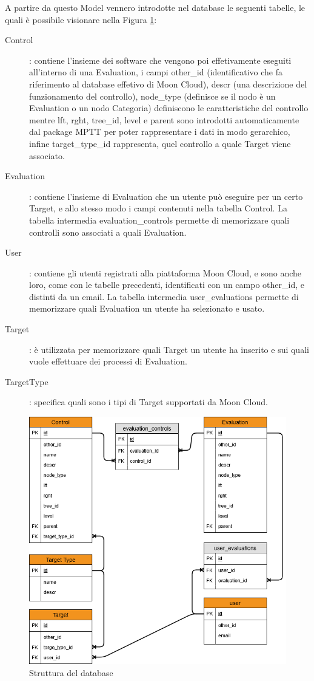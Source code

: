 A partire da questo Model vennero introdotte nel database le seguenti tabelle, le quali è possibile visionare nella Figura 
\ref{fig:str_db_project}:
\begin{description}
	\item[Control]: contiene l'insieme dei software che vengono poi effetivamente eseguiti all'interno di una Evaluation, 
	i campi other\_id (identificativo che fa riferimento al database effetivo di Moon Cloud),
	descr (una descrizione del funzionamento del controllo), node\_type (definisce se il nodo è un Evaluation o un nodo Categoria)
	definiscono le caratteristiche del controllo mentre lft, rght, tree\_id, level e parent sono introdotti 
	automaticamente dal package MPTT per poter rappresentare i dati in modo gerarchico, infine target\_type\_id rappresenta, quel
	controllo a quale Target viene associato. 
	\item[Evaluation]: contiene l'insieme di Evaluation che un utente può eseguire per un certo Target, e allo stesso modo 
	i campi contenuti nella tabella Control. La tabella intermedia evaluation\_controls permette di memorizzare quali controlli
	sono associati a quali Evaluation.
	\item[User]: contiene gli utenti registrati alla piattaforma Moon Cloud, e sono anche loro, come con le tabelle precedenti,
	identificati con un campo other\_id, e distinti da un email. La tabella intermedia user\_evaluations permette di memorizzare 
	quali Evaluation un utente ha selezionato e usato.
	\item[Target]: è utilizzata per memorizzare quali Target un utente ha inserito e sui quali vuole effettuare dei processi
	di Evaluation.  
	\item[TargetType]: specifica quali sono i tipi di Target supportati da Moon Cloud.
\end{description}

\begin{figure}
	\centering
	\includegraphics[scale=0.7]{images/MoonCloudRecommendation_ER.png}
	\caption{Struttura del database}
	\label{fig:str_db_project}
\end{figure}


